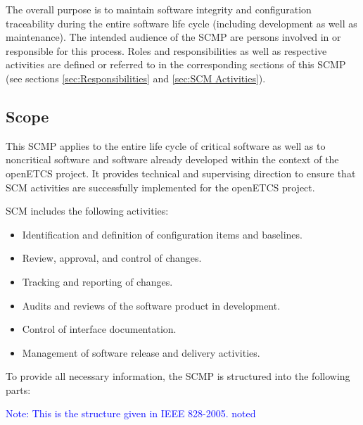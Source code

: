 \documentclass{template/openetcs_report}
\begin{document}
The overall purpose is to maintain software integrity and configuration traceability during the entire software life cycle (including development as well as maintenance). The intended audience of the SCMP are persons involved in or responsible for this process. Roles and responsibilities as well as respective activities are defined or referred to in the corresponding sections of this SCMP (see sections \ref{sec:Responsibilities} and \ref{sec:SCM Activities}).


\subsection{Scope } %
\label {sec:Scope}

This SCMP applies to the entire life cycle of critical software as well as to noncritical software and software already developed within the context of the openETCS project. It provides technical and supervising direction to ensure that SCM activities are successfully implemented for the openETCS project.

SCM includes the following activities:

\vspace{-10pt}
\begin{itemize}
\item Identification and definition of configuration items and baselines.
\item Review, approval, and control of changes.
\item Tracking and reporting of changes.
\item Audits and reviews of the software product in development.
\item Control of interface documentation.
\item Management of software release and delivery activities.
\end{itemize}

To provide all necessary information, the SCMP is structured into the following parts:

\textcolor{blue}{Note: This is the structure given in IEEE 828-2005. noted}
\end{document}
